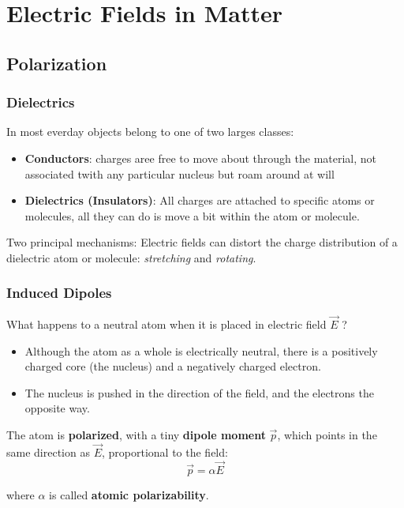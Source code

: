 \section{Electric Fields in Matter} %
\label{sec:Electric Fields in Matter}

\subsection{Polarization} %
\label{sub:Polarization}

\begin{frame}
  \frametitle{Dielectrics}

  In most everday objects belong to one of two larges classes:
  \begin{itemize}

      \item \textbf{Conductors}: charges aree free to move about through the material, not associated twith any particular nucleus but roam around at will

      \item \textbf{Dielectrics (Insulators)}: All charges are attached to specific atoms or molecules, all they can do is move a bit within the atom or molecule.

  \end{itemize}

  Two principal mechanisms: Electric fields can distort the charge distribution of a dielectric atom or molecule: \textit{stretching} and \textit{rotating}.



\end{frame}

\begin{frame}
  \frametitle{Induced Dipoles}

  What happens to a neutral atom when it is placed in electric field $\overrightarrow{E}$ ?

  \begin{itemize}

      \item Although the atom as a whole is electrically neutral, there is a positively charged core (the nucleus) and a negatively charged electron.
      \item The nucleus is pushed in the direction of the field, and the electrons the opposite way.

  \end{itemize}

  The atom is \textbf{polarized}, with a tiny \textbf{dipole moment} $\overrightarrow{p}$, which points in the same direction as $\overrightarrow{E}$, proportional to the field:
  \begin{equation}
    \overrightarrow{p} = \alpha \overrightarrow{E}
  \end{equation}

  where $\alpha$ is called \textbf{atomic polarizability}.



\end{frame}

